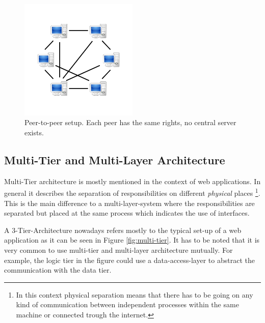 \begin{figure}[htbp]
	\centering
	\includegraphics[width=0.5\textwidth]{./content/pictures/P2P-network.jpg}
	\caption{Peer-to-peer setup. Each peer has the same rights, no central server exists.}
	\label{fig:p2p}
\end{figure}

\subsection{Multi-Tier and Multi-Layer Architecture}
\label{sec:multi-tier}
Multi-Tier architecture is mostly mentioned in the context of web applications. In general it describes the separation of responsibilities on different \emph{physical} places \footnote{In this context physical separation means that there has to be going on any kind of communication between independent processes within the same machine or connected trough the internet.}. This is the main difference to a multi-layer-system where the responsibilities are separated but placed at the same process which indicates the use of interfaces. 

A 3-Tier-Architecture nowadays refers mostly to the typical set-up of a web application as it can be seen in Figure \ref{fig:multi-tier}. It has to be noted that it is very common to use multi-tier and multi-layer architecture mutually. For example, the logic tier in the figure could use a data-access-layer to abstract the communication with the data tier. 

